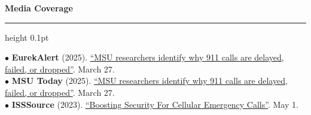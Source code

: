 {\large\bf Media Coverage}
\medskip\hrule height 0.1pt

\vspace{1 mm}




\begin{flushleft}

\hspace{1 mm} $\bullet$ \hspace{1 mm}
\textbf{EurekAlert} (2025).
\href{https://www.eurekalert.org/news-releases/1078473}{``MSU researchers identify why 911 calls are delayed, failed, or dropped''}. March 27. \\


\hspace{1 mm} $\bullet$ \hspace{1 mm}
\textbf{MSU Today} (2025).
\href{https://msutoday.msu.edu/news/2025/03/msu-researchers-identify-why-911-calls-are-delayed-failed-or-dropped}{``MSU researchers identify why 911 calls are delayed, failed, or dropped''}. March 27. \\







\hspace{1 mm} $\bullet$ \hspace{1 mm}
\textbf{ISSSource} (2023).
\href{https://www.isssource.com/boosting-security-for-cellular-emergency-calls/}{``Boosting Security For Cellular Emergency Calls''}. May 1. \\




\end{flushleft}
